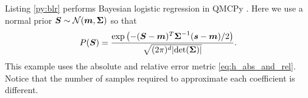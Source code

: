 \documentclass{article}[12pt]
\newcommand{\bvarepsabs}{\boldsymbol{\varepsilon}_\text{abs}}
\newcommand{\bvarepsrel}{\boldsymbol{\varepsilon}_\text{rel}}
\begin{document}
Listing \ref{py:blr} performs Bayesian logistic regression in QMCPy
. Here we use a normal prior $\boldsymbol{S} \sim \mathcal{N}(\boldsymbol{m},\boldsymbol{\Sigma})$ so that
$$P(\boldsymbol{S}) = \frac{\exp\left(-(\boldsymbol{S}-\boldsymbol{m})^T\boldsymbol{\Sigma}^{-1}(\boldsymbol{s}-\boldsymbol{m})/2\right)}{\sqrt{(2\pi)^d\lvert \det(\boldsymbol{\Sigma})\rvert }}.$$
This example uses the absolute and relative error metric \eqref{eq:h_abs_and_rel}. Notice that the number of samples required to approximate each coefficient is different. 





\end{document}
